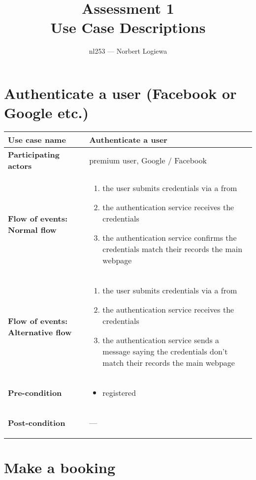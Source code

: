 \documentclass[a4paper, 13pt, draft]{report}
\author{nl253 --- Norbert Logiewa}
\title{%
	\huge{\bf{Assessment 1}} \\ 
	Use Case Descriptions \\ 
}
\begin{document}
\maketitle

\newcommand{\notapplicable}{%
	\begin{center} --- \end{center}
}

\section*{Authenticate a user (Facebook or Google etc.)}

\begin{center}
	\begin{tabular}{| >{\bf}l | p{5.55cm} |} 
		\hline
		Use case name & Authenticate a user \\ 
		\hline
		Participating actors & premium user, Google / Facebook \\
		\hline
		Flow of events: Normal flow & 
		\begin{enumerate}		
			\item the user submits credentials via a from
			\item the authentication service receives the credentials
			\item the authentication service confirms the credentials match their records
				the main webpage
		\end{enumerate}	\\
		\hline
		Flow of events: Alternative flow & 
		\begin{enumerate}		
			\item the user submits credentials via a from
			\item the authentication service receives the credentials
			\item the authentication service sends a message saying the credentials don't match their records
				the main webpage
		\end{enumerate}	\\
		\hline
		Pre-condition & 
		\begin{itemize} 
			\item registered
		\end{itemize} \\
		\hline
		Post-condition & \notapplicable \\ 
		\hline
	\end{tabular}
\end{center}

\section*{Make a booking}
\end{document}
